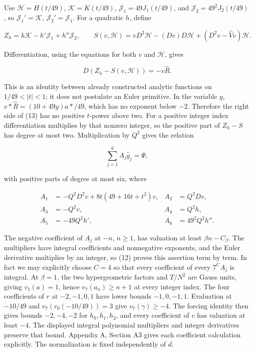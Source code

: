 \documentclass[11pt,a4paper]{article}
\begin{document}
Use \(\mathcal{H}=H(t/49)\), \(\mathcal{K}=K(t/49)\), \(\mathcal{J}_{1}=49J_{1}(t/49)\), and \(\mathcal{J}_{2}=49^{2}J_{2}(t/49)\), so \(\mathcal{J}_{1}'=\mathcal{K}\), \(\mathcal{J}_{2}'=\mathcal{J}_{1}\). For a quadratic \(h\), define

\[
Z_h=h\mathcal K-h'\mathcal J_1+h''\mathcal J_2,
\qquad
S(v,\mathcal H)=vD^2\mathcal H-(Dv)D\mathcal H+(D^2v-\widehat Vv)\mathcal H.
\]

Differentiation, using the equations for both \(v\) and \(\mathcal{H}\), gives

\[
D(Z_h-S(v,\mathcal H))=-v\widehat R.\tag{13}
\]

This is an identity between already constructed analytic functions on \(1/49<|t|<1\); it does not postulate an Euler primitive. In the variable \(y\), \(v*\widehat{R}=(10+49y)a*/49\), which has no exponent below \(-2\). Therefore the right side of (13) has no positive \(t\)-power above two. For a positive integer index differentiation multiplies by that nonzero integer, so the positive part of \(Z_h-S\) has degree at most two. Multiplication by \(Q^{2}\) gives the relation

\[
\sum_{j=1}^6 A_j\widehat g_j=\Psi,\tag{14}
\]

with positive parts of degree at most six, where

\[
\begin{aligned}
A_1&=-Q^2D^2v+8t(49+16t+t^2)v,&A_2&=Q^2Dv,\\
A_3&=-Q^2v,&A_4&=Q^2h,\\
A_5&=-49Q^2h',&A_6&=49^2Q^2h''.
\end{aligned}
\]

The negative coefficient of \(A_j\) at \(-n\), \(n≥1\), has valuation at least \(βn-C_β\). The multipliers have integral coefficients and nonnegative exponents, and the Euler derivative multiplies by an integer, so (12) proves this assertion term by term. In fact we may explicitly choose \(C=4\) so that every coefficient of every \(7^C A_j\) is integral. At \(β=1\), the two hypergeometric factors and \(T/N^{2}\) are Gauss units, giving \(v_{1}(a)=1\), hence \(v_{7}(a_n)≥n+1\) at every integer index. The four coefficients of \(r\) at \(-2,-1,0,1\) have lower bounds \(-1,0,-1,1\). Evaluation at \(-10/49\) and \(v_{7}(r_{0}(-10/49))=3\) give \(v_{7}(γ)≥-4\). The forcing identity then gives bounds \(-2,-4,-2\) for \(h_{0},h_{1},h_{2}\), and every coefficient of \(v\) has valuation at least \(-4\). The displayed integral polynomial multipliers and integer derivatives preserve that bound. Appendix A, Section A3 gives each coefficient calculation explicitly. The normalization is fixed independently of \(d\).
\end{document}
